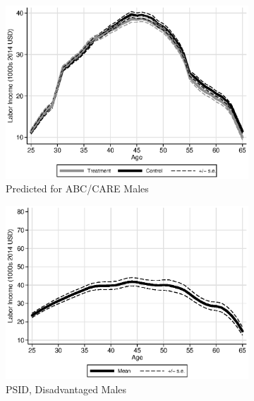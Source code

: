 \begin{figure}
\centering
\caption{Labor Income Profiles, Prediction Based on Lagged Labor Income and $W,Z$}\label{fig:labor-income-profiles}
\begin{subfigure}[h]{0.4\textwidth}
		\centering
		\caption{Predicted for ABC/CARE Males} \label{fig:abcare1}
		\includegraphics[width=\textwidth]{output/labor_25-60_male_3.eps}
\end{subfigure}%
\begin{subfigure}[h]{0.4\textwidth}
	\centering
	\caption{PSID, Disadvantaged Males} \label{fig:psid1}
		\includegraphics[width=\textwidth]{output/psid_incomeprofiles_s1.eps}
\end{subfigure}
\begin{subfigure}[h]{0.4\textwidth}
		\centering

\end{subfigure}
\end{figure}
